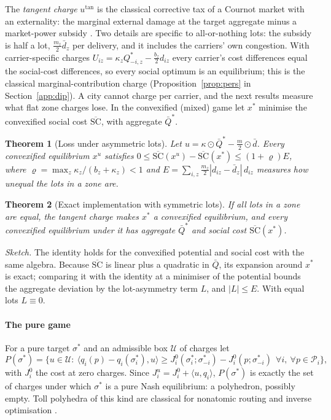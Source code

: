 \documentclass[preprint,11pt]{elsarticle}
\newtheorem{theorem}{Theorem}
\theoremstyle{definition}
\theoremstyle{remark}
\newcommand{\ip}[2]{\langle #1,#2\rangle}
\begin{document}
The \emph{tangent charge} $u^{\tan}$ is the classical corrective tax of a Cournot market with an externality: the marginal external damage at the target aggregate minus a market-power subsidy \citep{Buchanan1969,Barnett1980}. Two details are specific to all-or-nothing lots: the subsidy is half a lot, $\tfrac{m_z}{2}\bar d_z$ per delivery, and it includes the carriers' own congestion. With carrier-specific charges $U_{iz}=\kappa_zQ^*_{-i,z}-\tfrac{b_z}{2}d_{iz}$ every carrier's cost differences equal the social-cost differences, so every social optimum is an equilibrium; this is the classical marginal-contribution charge \citep{Wolpert2001,Marden2013} (Proposition~\ref{prop:pers} in Section~\ref{app:dip}). A city cannot charge per carrier, and the next results measure what flat zone charges lose. In the convexified (mixed) game let $x^*$ minimise the convexified social cost $\overline{\mathrm{SC}}$, with aggregate $\bar Q^*$.

\begin{theorem}[Loss under asymmetric lots]\label{thm:asym}
Let $u=\kappa\odot\bar Q^*-\tfrac m2\odot\bar d$. Every convexified equilibrium $x^u$ satisfies $0\le\overline{\mathrm{SC}}(x^u)-\overline{\mathrm{SC}}(x^*)\le(1+\varrho)E$, where $\varrho=\max_z\kappa_z/(b_z+\kappa_z)<1$ and $E=\sum_{i,z}\tfrac{m_z}{2}|d_{iz}-\bar d_z|\,d_{iz}$ measures how unequal the lots in a zone are.
\end{theorem}

\begin{theorem}[Exact implementation with symmetric lots]\label{thm:convex}
If all lots in a zone are equal, the tangent charge makes $x^*$ a convexified equilibrium, and every convexified equilibrium under it has aggregate $\bar Q^*$ and social cost $\overline{\mathrm{SC}}(x^*)$.
\end{theorem}

\emph{Sketch.} The identity holds for the convexified potential and social cost with the same algebra. Because $\overline{\mathrm{SC}}$ is linear plus a quadratic in $\bar Q$, its expansion around $x^*$ is exact; comparing it with the identity at a minimiser of the potential bounds the aggregate deviation by the lot-asymmetry term $L$, and $|L|\le E$. With equal lots $L\equiv0$.

\paragraph{The pure game} For a pure target $\sigma^*$ and an admissible box $\mathcal U$ of charges let
\[
P(\sigma^*)=\big\{u\in\mathcal U:\ \ip{q_i(p)-q_i(\sigma^*_i)}{u}\ge J^0_i(\sigma^*_i;\sigma^*_{-i})-J^0_i(p;\sigma^*_{-i})\ \ \forall i,\ \forall p\in\mathcal P_i\big\},
\]
with $J^0_i$ the cost at zero charges. Since $J^u_i=J^0_i+\ip{u}{q_i}$, $P(\sigma^*)$ is exactly the set of charges under which $\sigma^*$ is a pure Nash equilibrium: a polyhedron, possibly empty. Toll polyhedra of this kind are classical for nonatomic routing \citep{Bergendorff1997,Hearn1998} and inverse optimisation \citep{Ahuja2001}.
\end{document}
